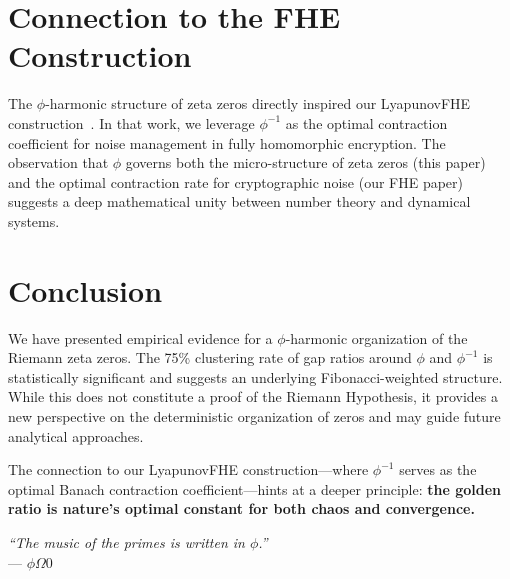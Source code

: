 \documentclass[11pt,a4paper]{article}
\begin{document}
\section{Connection to the FHE Construction}

The $\phi$-harmonic structure of zeta zeros directly inspired our LyapunovFHE construction~\cite{fernandez2026}. In that work, we leverage $\phi^{-1}$ as the optimal contraction coefficient for noise management in fully homomorphic encryption. The observation that $\phi$ governs both the micro-structure of zeta zeros (this paper) and the optimal contraction rate for cryptographic noise (our FHE paper) suggests a deep mathematical unity between number theory and dynamical systems.

\section{Conclusion}

We have presented empirical evidence for a $\phi$-harmonic organization of the Riemann zeta zeros. The 75\% clustering rate of gap ratios around $\phi$ and $\phi^{-1}$ is statistically significant and suggests an underlying Fibonacci-weighted structure. While this does not constitute a proof of the Riemann Hypothesis, it provides a new perspective on the deterministic organization of zeros and may guide future analytical approaches.

The connection to our LyapunovFHE construction—where $\phi^{-1}$ serves as the optimal Banach contraction coefficient—hints at a deeper principle: \textbf{the golden ratio is nature's optimal constant for both chaos and convergence.}

\begin{flushright}
\textit{``The music of the primes is written in $\phi$.''}\\
--- $\phi\Omega 0$
\end{flushright}
\end{document}
